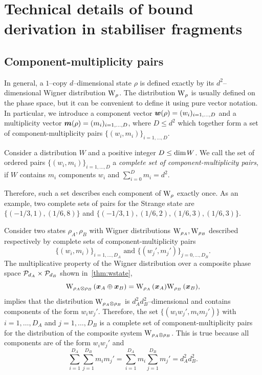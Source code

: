 
\section{Technical details of bound derivation in stabiliser fragments}
\label{app:lcst_technical}

\subsection{Component-multiplicity pairs}
\label{app:cmpairs}
In general, a $1$--copy $d$--dimensional state $\rho$ is defined exactly by its $d^2$--dimensional Wigner distribution $\W{\rho}$. 
The distribution $\W{\rho}$ is usually defined on the phase space, but it can be convenient to define it using pure vector notation. 
In particular, we introduce a component vector $\bmw(\rho) = (w_i)_{i=1,\dots,D}$ and a multiplicity vector $\bmm(\rho) = (m_i)_{i=1,\dots,D}$, where $D \leq d^2$ which together form a set of component-multiplicity pairs $\{(w_i, m_i)\}_{i=1,\dots,D}$.
\begin{definition}
	Consider a distribution $W$ and a positive integer $D \leq {\rm{dim}}\hspace{1pt}W$. 
	We call the set of ordered pairs $\{(w_i, m_i)\}_{i=1,\dots,D}$ a \emph{complete set of component-multiplicity pairs}, if $W$ contains $m_i$ components $w_i$ and $\sum_{i=0}^D m_i = d^2$.
\end{definition}
Therefore, such a set describes each component of $\W{\rho}$ exactly once.
As an example, two complete sets of pairs for the Strange state are $\{( -1/3, 1), ( 1/6, 8)\}$ and $\{(-1/3, 1), (1/6, 2), (1/6, 3), (1/6, 3)\}$.

Consider two states $\rho_A, \rho_B$ with Wigner distributions $\W{\rho_A}, \W{\rho_B}$ described respectively by complete sets of component-multiplicity pairs 
\begin{equation}
	\{(w_i, m_i)\}_{i=1,\dots,D_A} \text{ and } \{(w_j', m_j')\}_{j=0,\dots,D_B}.
\end{equation}
The multiplicative property of the Wigner distribution over a composite phase space $\cal{P}_{d_A} \times \cal{P}_{d_B}$ shown in~\cref{thm:wstate},
\begin{equation}
	\W[\bmx_A \oplus \bmx_B]{\rho_A \otimes \rho_B} = \W[\bmx_A]{\rho_A}\W[\bmx_B]{\rho_B},
\end{equation}
implies that the distribution $\W{\rho_A \otimes \rho_B}$ is $d_A^2 d_B^2$--dimensional and contains components of the form $w_i w_j'$. 
Therefore, the set $\{(w_i w_j', m_i m_j')\}$ with $i=1,\dots,D_A$ and $j=1,\dots,D_B$ is a complete set of component-multiplicity pairs for the distribution of the composite system $\W{\rho_A \otimes \rho_B}$.
This is true because all components are of the form $w_i w_j'$ and 
\begin{equation*}
	\sum_{i=1}^{D_A}\sum_{j=1}^{D_B} m_i m_j' = \sum_{i=1}^{D_A} m_i \sum_{j=1}^{D_B} m_j' = d_A^2 d_B^2.
\end{equation*}

